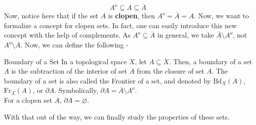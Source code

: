 $$\boxed{A^o\subseteq A\subseteq\overline{A}}$$
Now, notice here that if the set $A$ is \textbf{clopen}, then $A^o=\overline{A}=A$. Now, we want to formalize a concept for clopen sets. In fact, one can easily introduce this new concept with the help of complements. As $A^o\subseteq\overline{A}$ in general, we take $\overline{A}\setminus A^o$, not $A^o\setminus\overline{A}$. Now, we can define the following -
\begin{Definition}{Boundary of a Set}\label{boundary_set}
    In a topological space $X$, let $A\subseteq X$. Then, a boundary of a set $A$ is the subtraction of the interior of set $A$ from the closure of set $A$. The boundary of a set is also called the Frontier of a set, and denoted by $\mathrm{Bd}_X(A)$, $\mathrm{Fr}_X(A)$, or $\partial A$. Symbolically, $\partial A=\overline{A}\setminus A^o$.\\
    For a clopen set $A$, $\partial A=\varnothing$.
\end{Definition}
\noindent With that out of the way, we can finally study the properties of these sets.
